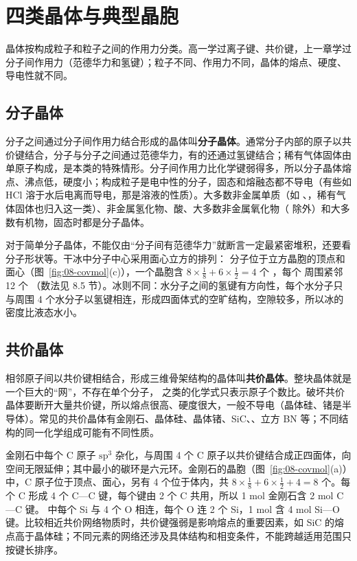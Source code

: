 \section{四类晶体与典型晶胞}

晶体按构成粒子和粒子之间的作用力分类。高一学过离子键、共价键，上一章学过分子间作用力（范德华力和氢键）；粒子不同、作用力不同，晶体的熔点、硬度、导电性就不同。

\subsection{分子晶体}

分子之间通过分子间作用力结合形成的晶体叫\textbf{分子晶体}。通常分子内部的原子以共价键结合，分子与分子之间通过范德华力，有的还通过氢键结合；稀有气体固体由单原子构成，是本类的特殊情形。分子间作用力比化学键弱得多，所以分子晶体熔点、沸点低，硬度小；构成粒子是电中性的分子，固态和熔融态都不导电（有些如 HCl 溶于水后电离而导电，那是溶液的性质）。大多数非金属单质（如 、，稀有气体固体也归入这一类）、非金属氢化物、酸、大多数非金属氧化物（ 除外）和大多数有机物，固态时都是分子晶体。

对于简单分子晶体，不能仅由“分子间有范德华力”就断言一定最紧密堆积，还要看分子形状等。干冰中分子中心采用面心立方的排列： 分子位于立方晶胞的顶点和面心（图~\ref{fig:08-covmol}(c)），一个晶胞含 $8\times\frac18+6\times\frac12=4$ 个 ，每个  周围紧邻 12 个 （数法见 8.5 节）。冰则不同：水分子之间的氢键有方向性，每个水分子只与周围 4 个水分子以氢键相连，形成四面体式的空旷结构，空隙较多，所以冰的密度比液态水小。

\subsection{共价晶体}

相邻原子间以共价键相结合，形成三维骨架结构的晶体叫\textbf{共价晶体}。整块晶体就是一个巨大的“网”，不存在单个分子， 之类的化学式只表示原子个数比。破坏共价晶体要断开大量共价键，所以熔点很高、硬度很大，一般不导电（晶体硅、锗是半导体）。常见的共价晶体有金刚石、晶体硅、晶体锗、SiC、、立方 BN 等；不同结构的同一化学组成可能有不同性质。

金刚石中每个 C 原子 $\mathrm{sp}^3$ 杂化，与周围 4 个 C 原子以共价键结合成正四面体，向空间无限延伸；其中最小的碳环是六元环。金刚石的晶胞（图~\ref{fig:08-covmol}(a)）中，C 原子位于顶点、面心，另有 4 个位于体内，共 $8\times\frac18+6\times\frac12+4=8$ 个。每个 C 形成 4 个 C—C 键，每个键由 2 个 C 共用，所以 1 mol 金刚石含 2 mol C—C 键。 中每个 Si 与 4 个 O 相连，每个 O 连 2 个 Si，1 mol  含 4 mol Si—O 键。比较相近共价网络物质时，共价键强弱是影响熔点的重要因素，如 SiC 的熔点高于晶体硅；不同元素的网络还涉及具体结构和相变条件，不能跨越适用范围只按键长排序。

